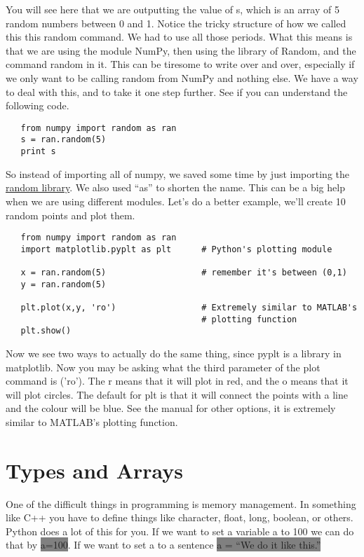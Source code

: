 \documentclass[11pt]{article}   %
\newcommand{\gray}[1]{\colorbox{gray}{#1}}
\begin{document}
You will see here that we are outputting the value of s, which is an array of 5 random numbers between 0 and 1.
Notice the tricky structure of how we called this this random command.  We had to use all those periods.  What this means
is that we are using the module NumPy, then using the library of Random, and the command random in it. This can be
tiresome to write over and over, especially if we only want to be calling random from NumPy and nothing else.  We have
a way to deal with this, and to take it one step further.  See if you can understand the following code.
\begin{tcolorbox}
   \begin{lstlisting}
   from numpy import random as ran
   s = ran.random(5)
   print s
   \end{lstlisting}
\end{tcolorbox}
So instead of importing all of numpy, we saved some time by just importing the \href{http://docs.scipy.org/doc/numpy/reference/routines.random.html}{random library}.  We also used ``as'' to 
shorten the name.  This can be a big help when we are using different modules.  Let's do a better example, we'll create 10 random points and plot them.  
\begin{tcolorbox}
   \begin{lstlisting}
   from numpy import random as ran
   import matplotlib.pyplt as plt      # Python's plotting module

   x = ran.random(5)                   # remember it's between (0,1)
   y = ran.random(5)

   plt.plot(x,y, 'ro')                 # Extremely similar to MATLAB's 
                                       # plotting function
   plt.show()
   \end{lstlisting}
\end{tcolorbox}
Now we see two ways to actually do the same thing, since pyplt is a library in matplotlib.  Now you may be asking what the third parameter of the plot command is ('ro').  The r means
that it will plot in red, and the o means that it will plot circles.  The default for plt is that it will connect the points with a line and the colour will be blue.  See the manual 
for other options, it is extremely similar to MATLAB's plotting function.

\section*{Types and Arrays}
One of the difficult things in programming is memory management.  In something like C++ you have to define things like character, float, long, boolean, or others.  Python does a lot of
this for you.  If we want to set a variable a to 100 we can do that by \gray{a=100}.  If we want to set a to a sentence \gray{a = ``We do it like this.''}
\end{document}
